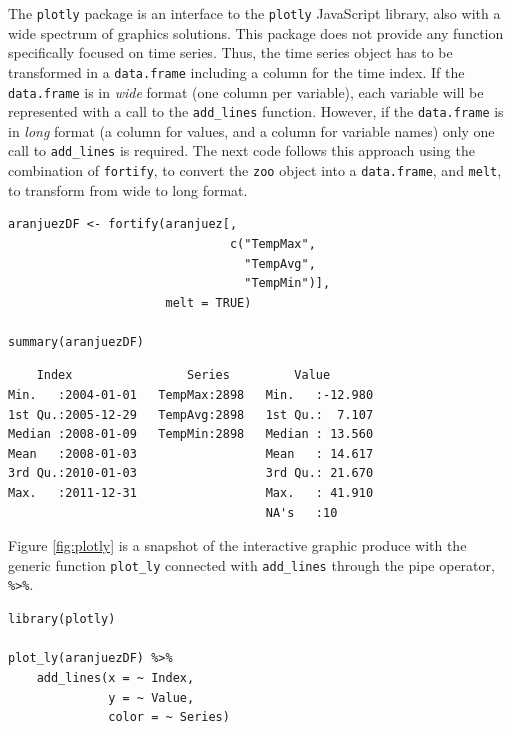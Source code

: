 \documentclass[smallroyalvopaper]{memoir}
\begin{document}
The \texttt{plotly} package is an interface to the \texttt{plotly} JavaScript
library, also with a wide spectrum of graphics solutions. This package
does not provide any function specifically focused on time
series. Thus, the time series object has to be transformed in a
\texttt{data.frame} including a column for the time index. If the
\texttt{data.frame} is in \emph{wide} format (one column per variable), each
variable will be represented with a call to the \texttt{add\_lines}
function. However, if the \texttt{data.frame} is in \emph{long} format (a column
for values, and a column for variable names) only one call to
\texttt{add\_lines} is required. The next code follows this approach using the
combination of \texttt{fortify}, to convert the \texttt{zoo} object into a
\texttt{data.frame}, and \texttt{melt}, to transform from wide to long format.


\lstset{language=r,label= ,caption= ,captionpos=b,numbers=none}
\begin{lstlisting}
aranjuezDF <- fortify(aranjuez[,
                               c("TempMax",
                                 "TempAvg",
                                 "TempMin")],
                      melt = TRUE)

summary(aranjuezDF)
\end{lstlisting}

\begin{verbatim}
    Index                Series         Value        
Min.   :2004-01-01   TempMax:2898   Min.   :-12.980  
1st Qu.:2005-12-29   TempAvg:2898   1st Qu.:  7.107  
Median :2008-01-09   TempMin:2898   Median : 13.560  
Mean   :2008-01-03                  Mean   : 14.617  
3rd Qu.:2010-01-03                  3rd Qu.: 21.670  
Max.   :2011-12-31                  Max.   : 41.910  
                                    NA's   :10
\end{verbatim}


Figure \ref{fig:plotly} is a snapshot of the interactive graphic produce
with the generic function \texttt{plot\_ly} connected with \texttt{add\_lines} through
the pipe operator, \texttt{\%>\%}.


\lstset{language=r,label= ,caption= ,captionpos=b,numbers=none}
\begin{lstlisting}
library(plotly)

plot_ly(aranjuezDF) %>%
    add_lines(x = ~ Index,
              y = ~ Value,
              color = ~ Series)

\end{lstlisting}
\end{document}
